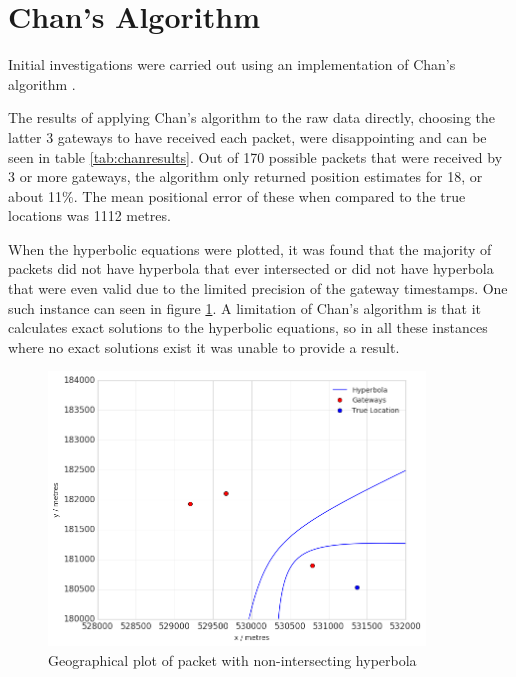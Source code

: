 \documentclass[a4paper]{report}
\begin{document}
  \section{Chan's Algorithm}

    Initial investigations were carried out using an implementation of Chan's algorithm \cite{Chan1994}.

    The results of applying Chan's algorithm to the raw data directly, choosing the latter 3 gateways to have received each packet, were disappointing and can be seen in table \ref{tab:chanresults}. Out of 170 possible packets that were received by 3 or more gateways, the algorithm only returned position estimates for 18, or about 11\%. The mean positional error of these when compared to the true locations was 1112 metres.

    When the hyperbolic equations were plotted, it was found that the majority of packets did not have hyperbola that ever intersected or did not have hyperbola that were even valid due to the limited precision of the gateway timestamps. One such instance can seen in figure \ref{fig:hyperbolanointersect}. A limitation of Chan's algorithm is that it calculates exact solutions to the hyperbolic equations, so in all these instances where no exact solutions exist it was unable to provide a result.

    \begin{figure}[ht]
    \centering
    \includegraphics[width=10cm]{figures/hyperbolanointersect.png}
    \caption{Geographical plot of packet with non-intersecting hyperbola}
    \label{fig:hyperbolanointersect}
    \end{figure}
\end{document}
